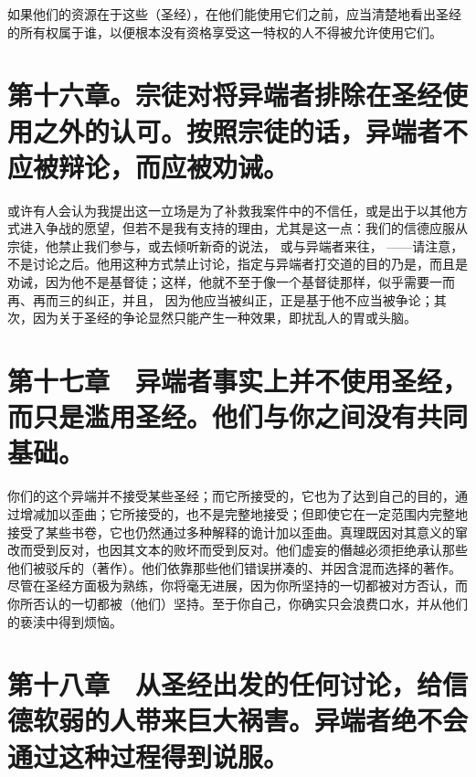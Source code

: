 如果他们的资源在于这些（圣经），在他们能使用它们之前，应当清楚地看出圣经的所有权属于谁，以便根本没有资格享受这一特权的人不得被允许使用它们。\par


\section{第十六章。宗徒对将异端者排除在圣经使用之外的认可。按照宗徒的话，异端者不应被辩论，而应被劝诫。}

或许有人会认为我提出这一立场是为了补救我案件中的不信任，或是出于以其他方式进入争战的愿望，但若不是我有支持的理由，尤其是这一点：我们的信德应服从宗徒，他禁止我们参与，或去倾听新奇的说法， 或与异端者来往， ——请注意，不是讨论之后。他用这种方式禁止讨论，指定与异端者打交道的目的乃是，而且是劝诫，因为他不是基督徒；这样，他就不至于像一个基督徒那样，似乎需要一而再、再而三的纠正，并且， 因为他应当被纠正，正是基于他不应当被争论；其次，因为关于圣经的争论显然只能产生一种效果，即扰乱人的胃或头脑。\par


\section{第十七章　异端者事实上并不使用圣经，而只是滥用圣经。他们与你之间没有共同基础。}

你们的这个异端并不接受某些圣经；而它所接受的，它也为了达到自己的目的，通过增减加以歪曲；它所接受的，也不是完整地接受；但即使它在一定范围内完整地接受了某些书卷，它也仍然通过多种解释的诡计加以歪曲。真理既因对其意义的窜改而受到反对，也因其文本的败坏而受到反对。他们虚妄的僭越必须拒绝承认那些他们被驳斥的（著作）。他们依靠那些他们错误拼凑的、并因含混而选择的著作。尽管在圣经方面极为熟练，你将毫无进展，因为你所坚持的一切都被对方否认，而你所否认的一切都被（他们）坚持。至于你自己，你确实只会浪费口水，并从他们的亵渎中得到烦恼。\par


\section{第十八章　从圣经出发的任何讨论，给信德软弱的人带来巨大祸害。异端者绝不会通过这种过程得到说服。}

